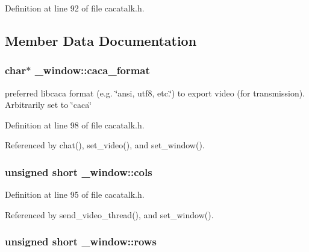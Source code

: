 \-Definition at line 92 of file cacatalk.\-h.



\subsection{\-Member \-Data \-Documentation}
\hypertarget{struct__window_a0fb378fdccd70a6f0d41c5150958def6}{
\subsubsection[{caca\-\_\-format}]{\setlength{\rightskip}{0pt plus 5cm}char$\ast$ {\bf \-\_\-window\-::caca\-\_\-format}}}\label{struct__window_a0fb378fdccd70a6f0d41c5150958def6}


preferred libcaca format (e.\-g. \char`\"{}ansi, utf8, etc.\char`\"{}) to export video (for transmission). \-Arbitrarily set to \char`\"{}caca\char`\"{} 



\-Definition at line 98 of file cacatalk.\-h.



\-Referenced by chat(), set\-\_\-video(), and set\-\_\-window().

\hypertarget{struct__window_a58d23390d6af61cfd5ee37d288278ca7}{
\subsubsection[{cols}]{\setlength{\rightskip}{0pt plus 5cm}unsigned short {\bf \-\_\-window\-::cols}}}\label{struct__window_a58d23390d6af61cfd5ee37d288278ca7}


\-Definition at line 95 of file cacatalk.\-h.



\-Referenced by send\-\_\-video\-\_\-thread(), and set\-\_\-window().

\hypertarget{struct__window_a59cb44669700308b223c28bd0abf45a2}{
\subsubsection[{rows}]{\setlength{\rightskip}{0pt plus 5cm}unsigned short {\bf \-\_\-window\-::rows}}}\label{struct__window_a59cb44669700308b223c28bd0abf45a2}


